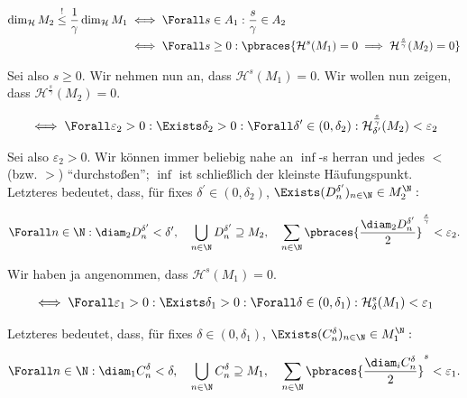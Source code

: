 \begin{solution}
\begin{align*}
    \dim_\mathcal{H} M_2
    \stackrel{!}{\leq}
    \frac{1}{\gamma}
    \dim_\mathcal{H} M_1
    & \iff
    \Forall s \in A_1:
        \frac{s}{\gamma} \in A_2 \\
    & \iff
    \Forall s \geq 0:
        \pbraces
        {
            \mathcal{H}^s(M_1) = 0
            \implies
            \mathcal{H}^\frac{s}{\gamma}(M_2) = 0
        }
\end{align*}

Sei also $s \geq 0$.
Wir nehmen nun an, dass $\mathcal{H}^s(M_1) = 0$.
Wir wollen nun zeigen, dass $\mathcal{H}^\frac{s}{\gamma}(M_2) = 0$.

\begin{align*}
    \iff
    \Forall \varepsilon_2 > 0:
    \Exists \delta_2 > 0:
    \Forall \delta^\prime \in (0, \delta_2):
        \mathcal{H}_{\delta^\prime}^\frac{s}{\gamma}(M_2) < \varepsilon_2
\end{align*}

Sei also $\varepsilon_2 > 0$.
Wir können immer beliebig nahe an $\inf$-s herran und jedes $<$ (bzw. $>$) \enquote{durchstoßen}; $\inf$ ist schließlich der kleinste Häufungspunkt.
Letzteres bedeutet, dass, für fixes $\delta^\prime \in (0, \delta_2)$, $\Exists (D_n^{\delta^\prime})_{n \in \N} \in M_2^\N:$

\begin{align*}
    \Forall n \in \N:
        \diam_2 D_n^{\delta^\prime} < \delta^\prime,
    \quad
    \bigcup_{n \in \N}
        D_n^{\delta^\prime} \supseteq M_2,
    \quad
    \sum_{n \in \N}
        \pbraces
        {
            \frac{\diam_2 D_n^{\delta^\prime}}{2}
        }^\frac{s}{\gamma}
        <
        \varepsilon_2.
\end{align*}

Wir haben ja angenommen, dass $\mathcal{H}^s(M_1) = 0$.

\begin{align*}    
    \iff
    \Forall \varepsilon_1 > 0:
    \Exists \delta_1 > 0:
    \Forall \delta \in (0, \delta_1):
    \mathcal{H}_\delta^s(M_1) < \varepsilon_1
\end{align*}

Letzteres bedeutet, dass, für fixes $\delta \in (0, \delta_1)$, $\Exists (C_n^\delta)_{n \in \N} \in M_1^\N:$

\begin{align*}
    \Forall n \in \N:
        \diam_1 C_n^\delta < \delta,
    \quad
    \bigcup_{n \in \N} C_n^\delta \supseteq M_1,
    \quad
    \sum_{n \in \N} \pbraces{\frac{\diam_i C_n^\delta}{2}}^s < \varepsilon_1.
\end{align*}


\end{solution}
